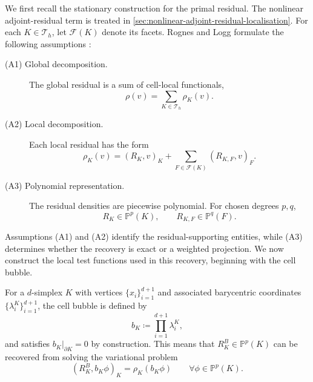 We first recall the stationary construction for the primal residual. The nonlinear adjoint-residual term is treated in \cref{sec:nonlinear-adjoint-residual-localisation}. For each \(K\in\mathcal T_h\), let \(\mathcal F(K)\) denote its facets. Rognes and Logg formulate the following assumptions \cite{Rognes_Logg_2013}:
\begin{description}
  \item[(A1) Global decomposition.] The global residual is a sum of cell-local functionals,
  \begin{equation}
    \rho(v)=\sum_{K\in\mathcal T_h}\rho_K(v).
    \label{eq:stationary-global-decomposition}
  \end{equation}

  \item[(A2) Local decomposition.] Each local residual has the form
  \begin{equation}
    \rho_K(v)
    =
    (R_K,v)_K
    +
    \sum_{F\in\mathcal F(K)}(R_{K,F},v)_F.
    \label{eq:stationary-residual-representation}
  \end{equation}

  \item[(A3) Polynomial representation.] The residual densities are piecewise polynomial. For chosen degrees \(p,q\),
  \begin{equation}
    R_K\in\mathbb P^p(K),
    \qquad
    R_{K,F}\in\mathbb P^q(F).
    \label{eq:stationary-polynomial-representability}
  \end{equation}
\end{description}
Assumptions (A1) and (A2) identify the residual-supporting entities, while (A3) determines whether the recovery is exact or a weighted projection. We now construct the local test functions used in this recovery, beginning with the cell bubble.

For a \(d\)-simplex \(K\) with vertices \(\{x_i\}_{i=1}^{d+1}\) and associated barycentric coordinates \(\{\lambda_i^K\}_{i=1}^{d+1}\), the cell bubble is defined by 
\begin{equation}
  b_K\coloneqq\prod_{i=1}^{d+1}\lambda_i^K,
  \label{eq:recovery-cell-bubble}
\end{equation}
and satisfies $b_K|_{\partial K}=0$ by construction.
This means that \(R_K^B\in\mathbb P^p(K)\) can be recovered from solving the variational problem
\begin{equation}
  (R_K^B,b_K\phi)_K
  =\rho_K(b_K\phi)
  \qquad\forall\phi\in\mathbb P^p(K).
  \label{eq:stationary-cell-projection}
\end{equation}

